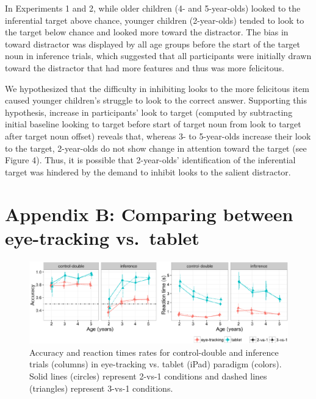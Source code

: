 \documentclass[a4paper,man,apacite,floatsintext]{apa6}
\newenvironment{CodeChunk}{}{}
\begin{document}
In Experiments 1 and 2, while older children (4- and 5-year-olds) looked
to the inferential target above chance, younger children (2-year-olds)
tended to look to the target below chance and looked more toward the
distractor. The bias in toward distractor was displayed by all age
groups before the start of the target noun in inference trials, which
suggested that all participants were initially drawn toward the
distractor that had more features and thus was more felicitous.

We hypothesized that the difficulty in inhibiting looks to the more
felicitous item caused younger children's struggle to look to the
correct answer. Supporting this hypothesis, increase in participants'
look to target (computed by subtracting initial baseline looking to
target before start of target noun from look to target after target noun
offset) reveals that, whereas 3- to 5-year-olds increase their look to
the target, 2-year-olds do not show change in attention toward the
target (see Figure 4). Thus, it is possible that 2-year-olds'
identification of the inferential target was hindered by the demand to
inhibit looks to the salient distractor.

\section{Appendix B: Comparing between eye-tracking
vs.~tablet}\label{appendix-b-comparing-between-eye-tracking-vs.tablet}

\begin{CodeChunk}
\begin{figure}[H]

{\centering \includegraphics{figs/etip_comp-1} 

}

\caption[Accuracy and reaction times rates for control-double and inference trials (columns) in eye-tracking vs]{Accuracy and reaction times rates for control-double and inference trials (columns) in eye-tracking vs. tablet (iPad) paradigm (colors). Solid lines (circles) represent 2-vs-1 conditions and dashed lines (triangles) represent 3-vs-1 conditions.}\label{fig:etip_comp}
\end{figure}
\end{CodeChunk}
\end{document}
